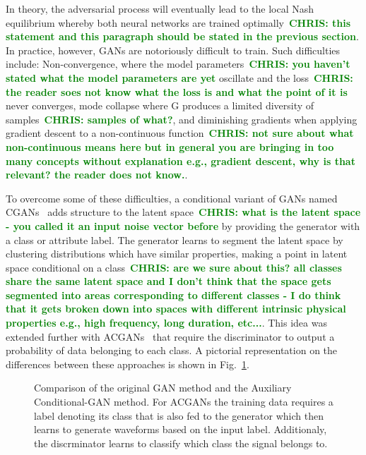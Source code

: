\documentclass[12pt]{iopart}
\newcommand{\chris}[1]{\textbf{\textcolor{green}{CHRIS: #1}}}
\begin{document}
%
In theory, the adversarial process will eventually lead to the local Nash
equilibrium \cite{Nash1950} whereby both neural networks are trained
optimally~\chris{this statement and this paragraph should be stated in the
previous section}.  In practice, however, \acp{GAN} are notoriously difficult
to train. Such difficulties include: Non-convergence, where the model
parameters~\chris{you haven't stated what the model parameters are yet}
oscillate and the loss~\chris{the reader soes not know what the loss is and
what the point of it is} never converges, mode collapse where G produces a
limited diversity of samples~\chris{samples of what?}, and diminishing
gradients when applying gradient descent to a non-continuous
function~\chris{not sure about what non-continuous means here but in general
you are bringing in too many concepts without explanation e.g., gradient
descent, why is that relevant? the reader does not know.}. 

%
To overcome some of these difficulties, a conditional variant of \acp{GAN}
named \acp{CGAN}~\cite{cgan} adds structure to the latent space~\chris{what is
the latent space - you called it an input noise vector before} by providing the
generator with a class or attribute label. The generator learns to segment the
latent space by clustering distributions which have similar properties, making
a point in latent space conditional on a class~\chris{are we sure about this?
all classes share the same latent space and I don't think that the space gets
segmented into areas corresponding to different classes - I do think that it
gets broken down into spaces with different intrinsic physical properties e.g.,
high frequency, long duration, etc...}. This idea was extended further with
\acp{ACGAN}~\cite{odena2016conditional} that require the discriminator to
output a probability of data belonging to each class. A pictorial
representation on the differences between these approaches is shown in
Fig.~\ref{fig:gan_comparison}. 

\begin{figure}
    \centering
    \caption{Comparison of the original GAN method and the Auxiliary
Conditional-GAN method. For ACGANs the training data requires a label denoting
its class that is also fed to the generator which then learns to generate
waveforms based on the input label. Additionaly, the discrminator learns to
classify which class the signal belongs to.} \label{fig:gan_comparison}
\end{figure}
\end{document}
